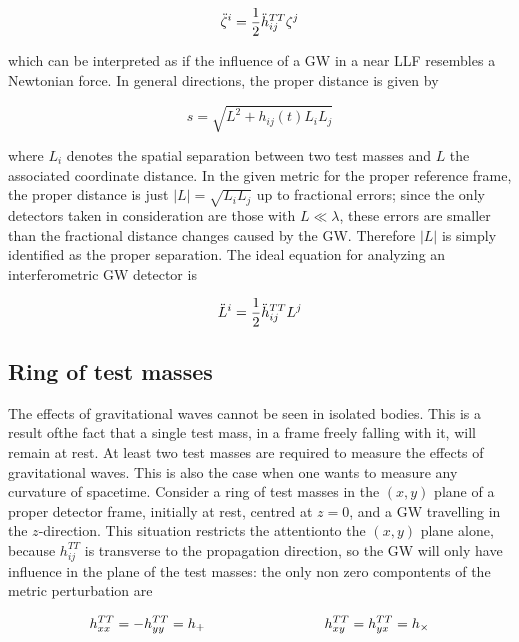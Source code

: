\documentclass[binding=0.6cm, LaM]{sapthesis}
\begin{document}
		\begin{equation}
		{\ddot \zeta}^i = {1 \over 2}{\ddot h}_{ij}^{TT}\zeta^j
		\end{equation}

	which can be interpreted as if the influence of a GW in a near LLF resembles a Newtonian force.
	In general directions, the proper distance is given by

		\begin{equation}
		s = \sqrt{L^2 + h_{ij}(t)L_{i}L_{j}}
		\end{equation}

	where $L_i$ denotes the spatial separation between two test masses and $L$ the associated coordinate distance.
	In the given metric for the proper reference frame, the proper distance is just $|L| = \sqrt{L_iL_j}$ up to fractional errors; 
	since the only detectors taken in consideration are those
	with $L \ll \lambda$, these errors are smaller than the fractional distance changes caused by the GW.
	Therefore $|L|$ is simply identified as the proper separation. The ideal equation for analyzing an interferometric GW detector is

		\begin{equation}
		{\ddot L}^i = {1 \over 2}{\ddot h}_{ij}^{TT}L^j
		\end{equation}


\subsection{Ring of test masses}

	The effects of gravitational waves cannot be seen in isolated bodies. 
	This is a result ofthe fact that a single test mass, in a frame freely falling with it, 
	will remain at rest. At least two test masses are required to measure the effects of gravitational waves. 
	This is also the case when one wants to measure any curvature of spacetime.
	Consider a ring of test masses in the $(x, y)$ plane of a proper detector frame, initially at rest, centred at $z = 0$, 
	and a GW travelling in the $z$-direction.
	This situation restricts the attentionto the $(x,y)$ plane alone, because $h_{ij}^{TT}$ is transverse to the propagation direction, 
	so the GW will only have influence in the plane of the test masses:
	the only non zero compontents of the metric perturbation are

		\begin{equation}
		h_{xx}^{TT} = - h_{yy}^{TT} = h_{+} \hspace*{3cm} h_{xy}^{TT} = h_{yx}^{TT} = h_{\times}
		\end{equation}
\end{document}
